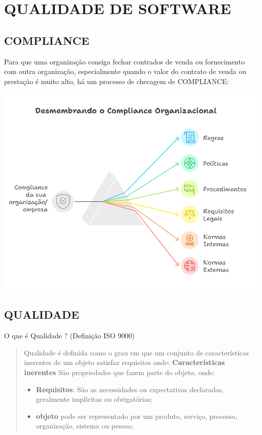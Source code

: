 \documentclass[
]{book}
\begin{document}
\chapter{QUALIDADE DE SOFTWARE}\label{qualidade-de-software}

\section{COMPLIANCE}\label{compliance}

Para que uma organização consiga fechar contrados de venda ou fornecimento com outra organização, especialmente quando o valor do contrato de venda ou prestação é muito alto, há um processo de checagem de COMPLIANCE:

\includegraphics{images/qualidade-geral/compliance.png}

\section{QUALIDADE}\label{qualidade}

O que é Qualidade ? (Definição ISO 9000)

\begin{quote}
Qualidade é definida como o grau em que um conjunto de características inerentes de um objeto satisfaz requisitos onde: \textbf{Características inerentes} São propriedades que fazem parte do objeto, onde:

\begin{itemize}
\item
  \textbf{Requisitos}: São as necessidades ou expectativas declaradas, geralmente implícitas ou obrigatórias;
\item
  \textbf{objeto} pode ser representado por um produto, serviço, processo, organização, sistema ou pessoa;
\end{itemize}
\end{quote}
\end{document}
